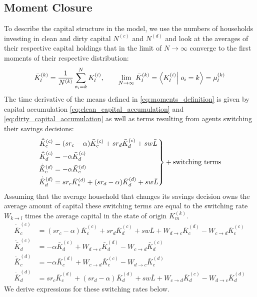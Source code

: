 \subsection{Moment Closure}

To describe the capital structure in the model, we use the numbers of households investing in clean and dirty capital $N^{(c)}$ and $N^{(d)}$ and look at the averages of their respective capital holdings that in the limit of $N \rightarrow \infty$ converge to the first moments of their respective distribution:
\begin{align}
	\bar{K}_l^{(k)} = \frac{1}{N^{(k)}}\sum_{o_i=k}^{N}K_l^{(i)}, \qquad \lim_{N \rightarrow \infty} \bar{K}_{l}^{(k)} = \braket{K_l^{(i)}}{o_i = k} = \mu_l^{(k)}
	\label{eq:moments_definition}
\end{align}
The time derivative of the means defined in \eqref{eq:moments_definition} is given by capital accumulation \eqref{eq:clean_capital_accumulation} and \eqref{eq:dirty_capital_accumulation} as well as terms resulting from agents switching their savings decisions: 
\begin{equation}
\left.  \begin{aligned}
		\dot{\bar{K}}_c^{(c)} &= (sr_c - \alpha)\bar{K}_c^{(c)} + s r_d \bar{K}_d^{(c)} + s w \bar{L} \nonumber \\
		\dot{\bar{K}}_d^{(c)} &= - \alpha\bar{K}_d^{(c)} \nonumber \\
		\dot{\bar{K}}_c^{(d)} &= - \alpha\bar{K}_c^{(d)} \nonumber \\
		\dot{\bar{K}}_d^{(d)} &= sr_c \bar{K}_c^{(d)} + (s r_d - \alpha)\bar{K}_d^{(d)} + s w \bar{L} \nonumber
	\end{aligned} \right\} + \rm{switching\ terms}
\end{equation}
Assuming that the average household that changes its savings decision owns the average amount of capital these switching terms are equal to the switching rate $W_{k \rightarrow l}$ times the average capital in the state of origin $K_m^{(k)}$.
\begin{align}
	\dot{\bar{K}}_c^{(c)} &= (sr_c - \alpha)\bar{K}_c^{(c)} + s r_d \bar{K}_d^{(c)} + s w \bar{L} + W_{d \rightarrow c} \bar{K}_c^{(d)} - W_{c \rightarrow d} \bar{K}_c^{(c)} \nonumber \\
	\dot{\bar{K}}_d^{(c)} &= - \alpha\bar{K}_d^{(c)} + W_{d \rightarrow c} \bar{K}_d^{(d)} - W_{c \rightarrow d} \bar{K}_d^{(c)} \nonumber \\
	\dot{\bar{K}}_c^{(d)} &= - \alpha\bar{K}_c^{(d)} + W_{c \rightarrow d} \bar{K}_c^{(c)} - W_{d \rightarrow c} \bar{K}_c^{(d)} \nonumber \\
	\dot{\bar{K}}_d^{(d)} &= sr_c \bar{K}_c^{(d)} + (s r_d - \alpha)\bar{K}_d^{(d)} + s w \bar{L} + W_{c \rightarrow d} \bar{K}_d^{(c)} - W_{d \rightarrow c} \bar{K}_d^{(d)}
	\label{eq:mean_capital_stocks}
\end{align}
We derive expressions for these switching rates below.
